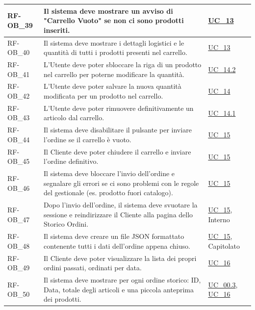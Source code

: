 \begin{longtable}{|>{\raggedright}p{}|>{\raggedright\arraybackslash}p{}|>{\raggedright\arraybackslash}p{}|}
    \hline
    RF-OB\_39 \hypertarget{rf-ob_39} & Il sistema deve mostrare un avviso di "Carrello Vuoto" se non ci sono prodotti inseriti. & \hyperref[uc_13]{UC\_13} \\
    \hline
    RF-OB\_40 \hypertarget{rf-ob_40} & Il sistema deve mostrare i dettagli logistici e le quantità di tutti i prodotti presenti nel carrello. & \hyperref[uc_13]{UC\_13} \\
    \hline
    RF-OB\_41 \hypertarget{rf-ob_41} & L'Utente deve poter sbloccare la riga di un prodotto nel carrello per poterne modificare la quantità. & \hyperref[uc_14.2]{UC\_14.2} \\
    \hline
    RF-OB\_42 \hypertarget{rf-ob_42} & L'Utente deve poter salvare la nuova quantità modificata per un prodotto nel carrello. & \hyperref[uc_14]{UC\_14} \\
    \hline
    RF-OB\_43 \hypertarget{rf-ob_43} & L'Utente deve poter rimuovere definitivamente un articolo dal carrello. & \hyperref[uc_14.1]{UC\_14.1} \\
    \hline
    RF-OB\_44 \hypertarget{rf-ob_44} & Il sistema deve disabilitare il pulsante per inviare l'ordine se il carrello è vuoto. & \hyperref[uc_15]{UC\_15} \\
    \hline
    RF-OB\_45 \hypertarget{rf-ob_45} & Il Cliente deve poter chiudere il carrello e inviare l'ordine definitivo. & \hyperref[uc_15]{UC\_15} \\
    \hline
    RF-OB\_46 \hypertarget{rf-ob_46} & Il sistema deve bloccare l'invio dell'ordine e segnalare gli errori se ci sono problemi con le regole del gestionale (es. prodotto fuori catalogo). & \hyperref[uc_15]{UC\_15} \\
    \hline
    RF-OB\_47 \hypertarget{rf-ob_47} & Dopo l'invio dell'ordine, il sistema deve svuotare la sessione e reindirizzare il Cliente alla pagina dello Storico Ordini. & \hyperref[uc_15]{UC\_15}, Interno \\
    \hline
    RF-OB\_48 \hypertarget{rf-ob_48} & Il sistema deve creare un file JSON formattato contenente tutti i dati dell'ordine appena chiuso. & \hyperref[uc_15]{UC\_15}, Capitolato \\
    \hline
    RF-OB\_49 \hypertarget{rf-ob_49} & Il Cliente deve poter visualizzare la lista dei propri ordini passati, ordinati per data. & \hyperref[uc_16]{UC\_16} \\
    \hline
    RF-OB\_50 \hypertarget{rf-ob_50} & Il sistema deve mostrare per ogni ordine storico: ID, Data, totale degli articoli e una piccola anteprima dei prodotti. & \hyperref[uc_00.3]{UC\_00.3}, \hyperref[uc_16]{UC\_16} \\

\end{longtable}
